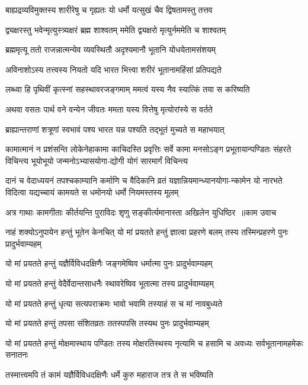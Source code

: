 \twolineshloka
{बाह्यद्रव्यविमुक्तस्य शारीरेषु च गृह्यतः}
{यो धर्मो यत्सुखं चैव द्विषतामस्तु तत्तव}


\twolineshloka
{द्व्यक्षरस्तु भवेन्मृत्युस्त्र्यक्षरं ब्रह्म शाश्वतम्}
{ममेति द्व्यक्षरो मृत्युर्नममेति च शाश्वतम्}


\twolineshloka
{ब्रह्ममृत्यू ततो राजन्नात्मन्येव व्यवस्थितौ}
{अदृश्यमानौ भूतानि योधयेतामसंशयम्}


\twolineshloka
{अविनाशोऽस्य तत्त्वस्य नियतो यदि भारत}
{भित्त्वा शरीरं भूतानामहिंसां प्रतिपद्यते}


\twolineshloka
{लब्ध्वा हि पृथिवीं कृत्स्नां सहस्थावरजङ्गमाम्}
{ममत्वं यस्य नैव स्यात्किं तया स करिष्यति}


\twolineshloka
{अथवा वसतः पार्थ वने वन्येन जीवतः}
{ममता यस्य वित्तेषु मृत्योरांस्ये स वर्तते}


\twolineshloka
{ब्राह्यान्तराणां शत्रूणां स्वभावं पश्य भारत}
{यन्न पश्यति तद्भूतं मुच्यते स महाभयात्}


\threelineshloka
{कामात्मानं न प्रशंसन्ति लोकेनेहाकामा काचिदस्ति प्रवृत्तिः}
{सर्वे कामा मनसोऽङ्ग प्रभूतायान्पण्डितः संहरते विचिन्त्य}
{भूयोभूयो जन्मनोऽभ्यासयोगा-द्योगी योगं सारमार्गं विचिन्त्य}


\threelineshloka
{दानं च वेदाध्ययनं तपश्चकाम्यानि कर्माणि च वैदिकानि}
{व्रतं यज्ञान्नियमान्ध्यानयोगा-न्कामेन यो नारभते विदित्वा}
{यद्यच्चायं कामयते स धमोनयो धर्मो नियमस्तस्य मूलम्}


\threelineshloka
{अत्र गाथाः कामगीताः कीर्तयन्ति पुराविदः}
{शृणु सङ्कीर्त्यमानास्ता अखिलेन युधिष्ठिर ॥काम उवाच}
{}


नाहं शक्योऽनुपायेन हन्तुं भूतेन केनचित्
\twolineshloka
{यो मां प्रयतते हन्तुं ज्ञात्वा प्रहरणे बलम्}
{तस्य तस्मिन्प्रहरणे पुनः प्रादुर्भवाम्यहम्}


\twolineshloka
{यो मां प्रयतते हन्तुं यज्ञैर्विविधदक्षिणैः}
{जङ्गमेष्विव धर्मात्मा पुनः प्रादुर्भवाम्यहम्}


\twolineshloka
{यो मां प्रयतते हन्तुं वेदैर्वेदान्तसाधनैः}
{स्थावरेष्विव भूतात्मा तस्य प्रादुर्भवाम्यहम्}


\twolineshloka
{यो मां प्रयतते हन्तुं धृत्या सत्यपराक्रमः}
{भावो भवामि तस्याहं स च मां नावबुध्यते}


\twolineshloka
{यो मां प्रयतते हन्तुं तपसा संशितव्रतः}
{ततस्पपसि तस्यथ पुनः प्रादुर्भवाम्यहम्}


\threelineshloka
{यो मां प्रयतते हन्तुं मोक्षमास्थाय पण्डितः}
{तस्य मोक्षरतिस्थस्य नृत्यामि च हसामि च}
{अवध्यः सर्वभूतानामहमेकः सनातनः}


\twolineshloka
{तस्मात्त्वमपि तं कामं यज्ञैर्विविधदक्षिणैः}
{धर्मे कुरु महाराज तत्र ते स भविष्यति}


